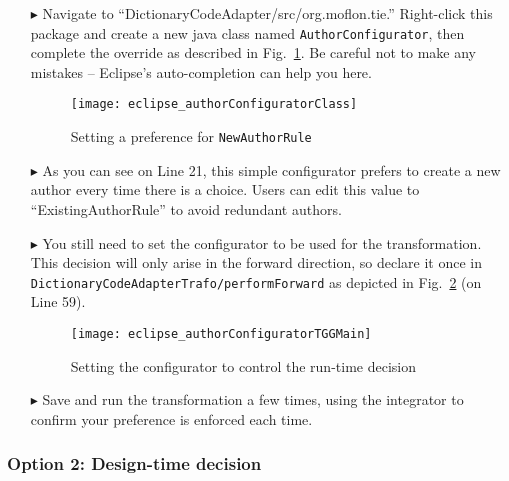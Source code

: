 \begin{itemize}

\item[$\blacktriangleright$] Navigate to ``DictionaryCodeAdapter/src/org.moflon.tie.'' Right-click this package and create a new java class named
\texttt{Author\-Config\-ur\-at\-or}, then complete the override as described in Fig.~\ref{eclipse:authorConfig}. Be careful not to make any mistakes --
Eclipse's auto-completion can help you here.

\begin{figure}[htbp]
  \texttt{[image: eclipse\_authorConfiguratorClass]}
  \caption{Setting a preference for \texttt{NewAuthorRule}}
  \label{eclipse:authorConfig}
\end{figure}

\item[$\blacktriangleright$] As you can see on Line 21, this simple configurator prefers to create a new author every time there is a choice. Users can
edit this value to ``ExistingAuthorRule'' to avoid redundant authors.

\item[$\blacktriangleright$] You still need to set the configurator to be used for the transformation. This decision will only arise in the forward direction,
so declare it once in \texttt{Dict\-ion\-ar\-y\-Code\-Ad\-ap\-ter\-Traf\-o/\-per\-form\-For\-ward} as depicted in Fig.~\ref{eclipse:editTGGMain} (on Line 59).

\newpage

\vspace*{0.5cm}

\begin{figure}[htbp]
\begin{center}
  \texttt{[image: eclipse\_authorConfiguratorTGGMain]}
  \caption{Setting the configurator to control the run-time decision}
  \label{eclipse:editTGGMain}
\end{center}
\end{figure}

\item[$\blacktriangleright$] Save and run the transformation a few times, using the integrator to confirm your preference is enforced each time.

\end{itemize}

\subsubsection{Option 2: Design-time decision}

